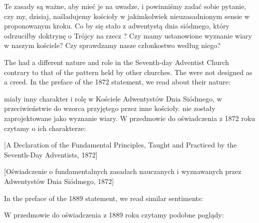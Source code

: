 Te zasady są ważne, aby mieć je na uwadze, i powinniśmy zadać sobie pytanie, czy my, dzisiaj, naśladujemy kościoły w jakimkolwiek nieuzasadnionym sensie w proponowanym kroku. Co by się stało z adwentystą dnia siódmego, który odrzuciłby doktrynę o Trójcy na rzecz ? Czy mamy ustanowione wyznanie wiary w naszym kościele? Czy sprawdzamy nasze członkostwo według niego?


The  had a different nature and role in the Seventh-day Adventist Church contrary to that of the pattern held by other churches. The  were not designed as a creed. In the preface of the 1872 statement, we read about their nature:


 miały inny charakter i rolę w Kościele Adwentystów Dnia Siódmego, w przeciwieństwie do wzorca przyjętego przez inne kościoły.  nie zostały zaprojektowane jako wyznanie wiary. W przedmowie do oświadczenia z 1872 roku czytamy o ich charakterze:


[A Declaration of the Fundamental Principles, Taught and Practiced by the Seventh-Day Adventists, 1872]


[Oświadczenie o fundamentalnych zasadach nauczanych i wyznawanych przez Adwentystów Dnia Siódmego, 1872]


In the preface of the 1889 statement, we read similar sentiments:


W przedmowie do oświadczenia z 1889 roku czytamy podobne poglądy:


